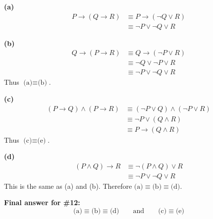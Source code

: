 \documentclass[11pt,a4paper]{article}
\newcommand{\sub}[1]{\par\medskip\textbf{(#1)}\ }
\begin{document}
\sub{a}
\begin{align*}
P\to(Q\to R) &\equiv P\to(\neg Q\lor R)\\
&\equiv\neg P\lor\neg Q\lor R
\end{align*}

\sub{b}
\begin{align*}
Q\to(P\to R) &\equiv Q\to(\neg P\lor R)\\
&\equiv\neg Q\lor\neg P\lor R\\
&\equiv\neg P\lor\neg Q\lor R
\end{align*}
Thus $\boxed{\text{(a)}\equiv\text{(b)}}$.

\sub{c}
\begin{align*}
(P\to Q)\land(P\to R) &\equiv(\neg P\lor Q)\land(\neg P\lor R)\\
&\equiv\neg P\lor(Q\land R)\\
&\equiv P\to(Q\land R)
\end{align*}
Thus $\boxed{\text{(c)}\equiv\text{(e)}}$.

\sub{d}
\begin{align*}
(P\land Q)\to R &\equiv\neg(P\land Q)\lor R\\
&\equiv\neg P\lor\neg Q\lor R
\end{align*}
This is the same as (a) and (b). Therefore $\boxed{\text{(a)}\equiv\text{(b)}\equiv\text{(d)}}$.

\medskip
\textbf{Final answer for \#12:}
\[
\boxed{\text{(a)}\equiv\text{(b)}\equiv\text{(d)}\qquad\text{and}\qquad\text{(c)}\equiv\text{(e)}}
\]
\end{document}
